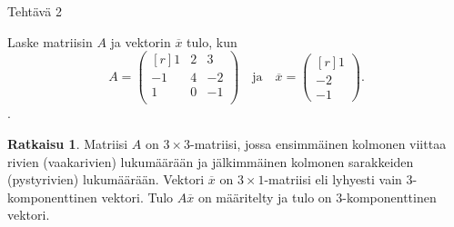 \documentclass[12pt, a4paper, t]{beamer}
\theoremstyle{exercise}
\theoremstyle{remark}
\theoremstyle{definition}
\renewcommand{\bar}[1]{\overline{#1}}
\newtheorem*{rat}{Ratkaisu}
\begin{document}
\begin{frame}{Tehtävä 2}

\vspace{12pt}
\begin{tcolorbox} Laske matriisin $A$ ja vektorin $\bar{x}$ tulo, kun
$$
A=\begin{pmatrix*}[r]
1 & 2 & 3\\
-1 & 4 & -2\\
1 & 0&-1\\
\end{pmatrix*}\quad\text{ja}\quad \bar{x}=\begin{pmatrix*}[r]
1\\
-2\\
-1
\end{pmatrix*}.
$$.\end{tcolorbox}

\vspace{100pt}

\begin{rat}
Matriisi $A$ on $3\times 3$-matriisi, jossa ensimmäinen kolmonen viittaa rivien (vaakarivien) lukumäärään ja jälkimmäinen kolmonen sarakkeiden (pystyrivien) lukumäärään. Vektori $\bar{x}$ on $3\times 1$-matriisi eli lyhyesti vain $3$-komponenttinen vektori. Tulo $A\bar{x}$ on määritelty ja tulo on $3$-komponenttinen vektori.
\end{rat}

\end{frame}
\end{document}

